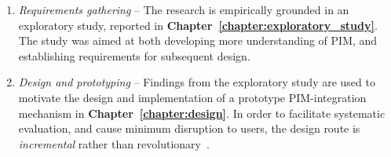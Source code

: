 \begin{enumerate}

\item \textit{Requirements gathering} -- The research is empirically grounded in an exploratory study, reported in \textbf{Chapter~\ref{chapter:exploratory_study}}.  The study was aimed at both developing more understanding of PIM, and establishing requirements for subsequent design.  %

\item \textit{Design and prototyping} -- Findings from the exploratory study are used to motivate the design and implementation of a prototype PIM-integration mechanism in \textbf{Chapter~\ref{chapter:design}}. In order to facilitate systematic evaluation, and cause minimum disruption to users, the design route is \textit{incremental} rather than revolutionary~\citep{newman:95}. %


\end{enumerate}
